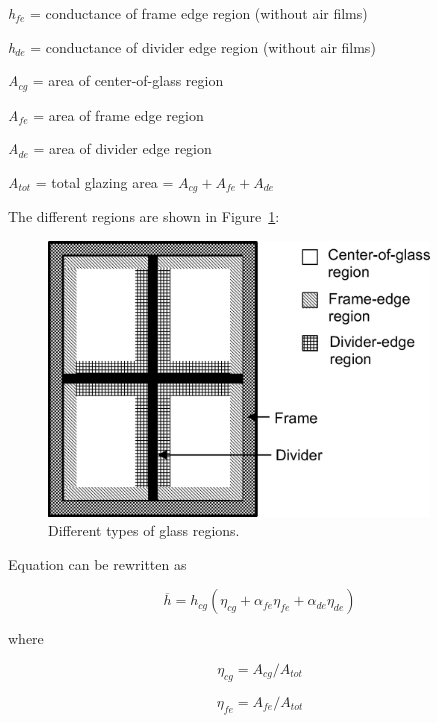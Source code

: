 \emph{h\(_{fe}\)} = conductance of frame edge region (without air films)

\emph{h\(_{de}\)} = conductance of divider edge region (without air films)

\emph{A\(_{cg}\)} = area of center-of-glass region

\emph{A\(_{fe}\)} = area of frame edge region

\emph{A\(_{de}\)} = area of divider edge region

\emph{A\(_{tot}\)} = total glazing area = \({A_{cg}} + {A_{fe}} + {A_{de}}\)

The different regions are shown in Figure~\ref{fig:different-types-of-glass-regions.}:

\begin{figure}[hbtp] %
\centering
\includegraphics[width=0.9\textwidth, height=0.9\textheight, keepaspectratio=true]{media/image1534.png}
\caption{Different types of glass regions. \label{fig:different-types-of-glass-regions.}}
\end{figure}

Equation can be rewritten as

\begin{equation}
\overline h  = {h_{cg}}\left( {{\eta_{cg}} + {\alpha_{fe}}{\eta_{fe}} + {\alpha_{de}}{\eta_{de}}} \right)
\end{equation}

where

\begin{equation}
{\eta_{cg}} = {A_{cg}}/{A_{tot}}
\end{equation}

\begin{equation}
{\eta_{fe}} = {A_{fe}}/{A_{tot}}
\end{equation}

